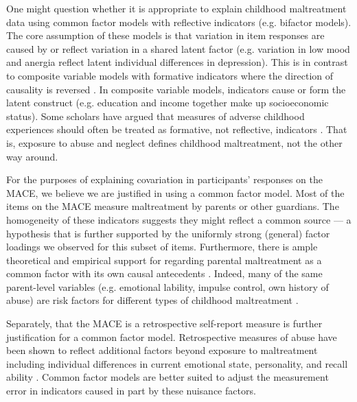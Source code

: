 \documentclass[letterpaper,man,natbib,noextraspace,floatsintext,longtable,12pt]{apa6}
\begin{document}
One might question whether it is appropriate to explain childhood maltreatment data using common factor models with reflective indicators (e.g. bifactor models). The core assumption of these models is that variation in item responses are caused by or reflect variation in a shared latent factor (e.g. variation in low mood and anergia reflect latent individual differences in depression). This is in contrast to composite variable models with formative indicators where the direction of causality is reversed . In composite variable models, indicators cause or form the latent construct (e.g. education and income together make up socioeconomic status). Some scholars have argued that measures of adverse childhood experiences should often be treated as formative, not reflective, indicators . That is, exposure to abuse and neglect defines childhood maltreatment, not the other way around. 

For the purposes of explaining covariation in participants' responses on the MACE, we believe we are justified in using a common factor model. Most of the items on the MACE measure maltreatment by parents or other guardians. The homogeneity of these indicators suggests they might reflect a common source --- a hypothesis that is further supported by the uniformly strong (general) factor loadings we observed for this subset of items. Furthermore, there is ample theoretical and empirical support for regarding parental maltreatment as a common factor with its own causal antecedents . Indeed, many of the same parent-level variables (e.g. emotional lability, impulse control, own history of abuse) are risk factors for different types of childhood maltreatment . 

Separately, that the MACE is a retrospective self-report measure is further justification for a common factor model. Retrospective measures of abuse have been shown to reflect additional factors beyond exposure to maltreatment including individual differences in current emotional state, personality, and recall ability . Common factor models are better suited to adjust the measurement error in indicators caused in part by these nuisance factors.
\end{document}
